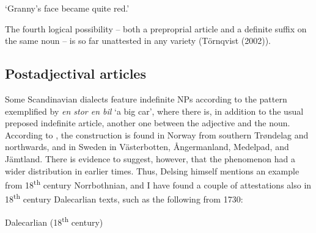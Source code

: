 \begin{styleTranslation}
‘Granny’s face became quite red.’ 

\end{styleTranslation}

\begin{styleBodyTextFirst}
The fourth logical possibility – both a preproprial article and a definite suffix on the same noun – is so far unattested in any variety (Törnqvist (2002)). 

\end{styleBodyTextFirst}

\subsection{\rmfamily Postadjectival articles}

\begin{styleBodyTextFirst}
Some Scandinavian dialects feature indefinite NPs according to the pattern exemplified by \textit{en stor en bil }‘a big car’, where there is, in addition to the usual preposed indefinite article, another one between the adjective and the noun. According to \citet[46]{Delsing2003a}, the construction is found in Norway from southern Trøndelag and northwards, and in Sweden in Västerbotten, Ångermanland, Medelpad, and Jämtland. There is evidence to suggest, however, that the phenomenon had a wider distribution in earlier times. Thus, Delsing himself mentions an example from 18\textsuperscript{th} century Norrbothnian, and I have found a couple of attestations also in 18\textsuperscript{th} century Dalecarlian texts, such as the following from 1730: 

\end{styleBodyTextFirst}

\begin{listWWNumileveli}
\item 

\begin{styleExample}
Dalecarlian (18\textsuperscript{th} century)

\end{styleExample}

\end{listWWNumileveli}

